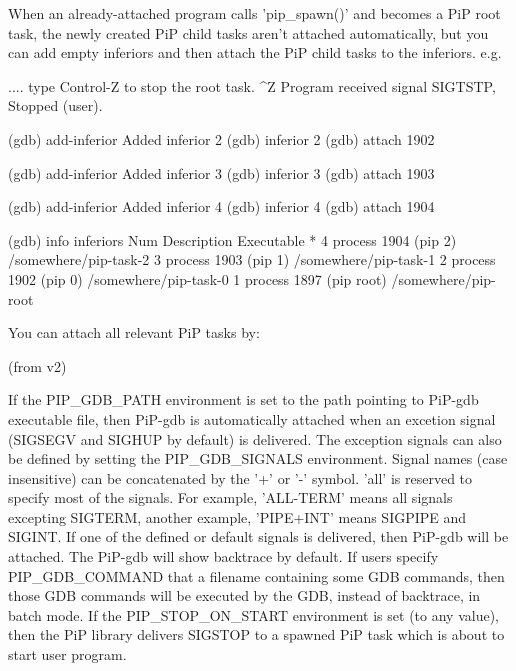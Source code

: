 When an already-\/attached program calls 'pip\-\_\-spawn()' and becomes a Pi\-P root task, the newly created Pi\-P child tasks aren't attached automatically, but you can add empty inferiors and then attach the Pi\-P child tasks to the inferiors. e.\-g. \begin{DoxyVerb}.... type Control-Z to stop the root task.
^Z
Program received signal SIGTSTP, Stopped (user).

(gdb) add-inferior
Added inferior 2
(gdb) inferior 2
(gdb) attach 1902

(gdb) add-inferior
Added inferior 3
(gdb) inferior 3
(gdb) attach 1903

(gdb) add-inferior
Added inferior 4
(gdb) inferior 4
(gdb) attach 1904

(gdb) info inferiors
  Num  Description              Executable
* 4    process 1904 (pip 2)     /somewhere/pip-task-2
  3    process 1903 (pip 1)     /somewhere/pip-task-1
  2    process 1902 (pip 0)     /somewhere/pip-task-0
  1    process 1897 (pip root)  /somewhere/pip-root
\end{DoxyVerb}


You can attach all relevant Pi\-P tasks by\-: 


(from v2)

If the P\-I\-P\-\_\-\-G\-D\-B\-\_\-\-P\-A\-T\-H environment is set to the path pointing to Pi\-P-\/gdb executable file, then Pi\-P-\/gdb is automatically attached when an excetion signal (S\-I\-G\-S\-E\-G\-V and S\-I\-G\-H\-U\-P by default) is delivered. The exception signals can also be defined by setting the P\-I\-P\-\_\-\-G\-D\-B\-\_\-\-S\-I\-G\-N\-A\-L\-S environment. Signal names (case insensitive) can be concatenated by the '+' or '-\/' symbol. 'all' is reserved to specify most of the signals. For example, 'A\-L\-L-\/\-T\-E\-R\-M' means all signals excepting S\-I\-G\-T\-E\-R\-M, another example, 'P\-I\-P\-E+\-I\-N\-T' means S\-I\-G\-P\-I\-P\-E and S\-I\-G\-I\-N\-T. If one of the defined or default signals is delivered, then Pi\-P-\/gdb will be attached. The Pi\-P-\/gdb will show backtrace by default. If users specify P\-I\-P\-\_\-\-G\-D\-B\-\_\-\-C\-O\-M\-M\-A\-N\-D that a filename containing some G\-D\-B commands, then those G\-D\-B commands will be executed by the G\-D\-B, instead of backtrace, in batch mode. If the P\-I\-P\-\_\-\-S\-T\-O\-P\-\_\-\-O\-N\-\_\-\-S\-T\-A\-R\-T environment is set (to any value), then the Pi\-P library delivers S\-I\-G\-S\-T\-O\-P to a spawned Pi\-P task which is about to start user program.

